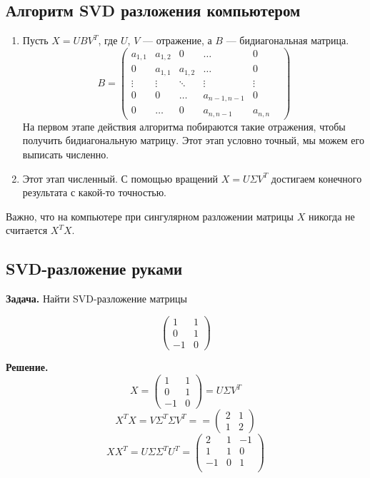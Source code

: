 \documentclass[12pt]{article} %
\theoremstyle{definition} %
\begin{document}
\subsection{Алгоритм SVD разложения компьютером}

\begin{enumerate}
\item Пусть $X=UBV^T$, где $U$, $V$ — отражение, а $B$ — бидиагональная матрица.
\[
B = \begin{pmatrix}
a_{1,1} & a_{1,2} & 0 & \hdots & 0 \\
0 & a_{1,1} & a_{1,2} & \hdots & 0 \\
\vdots & \vdots & \ddots & \vdots & \vdots \\
0 & 0 & \hdots & a_{n-1,n-1} & 0 \\
0 & \hdots & 0 & a_{n,n-1} & a_{n,n} &
\end{pmatrix}
\]
На первом этапе действия алгоритма побираются такие отражения, чтобы получить бидиагональную матрицу. Этот этап условно точный, мы можем его выписать численно.
\item Этот этап численный. С помощью вращений  $X = U \Sigma V^T$ достигаем конечного результата с какой-то точностью.
\end{enumerate}

Важно, что на компьютере при сингулярном разложении матрицы $X$ никогда не считается $X^TX$.
\subsection{SVD-разложение руками}
\textbf{Задача.} Найти SVD-разложение матрицы

\[
\begin{pmatrix}
1 & 1  \\
0 & 1 \\
-1 & 0
\end{pmatrix}
\]

\textbf{Решение.}
\[
X = \begin{pmatrix}
1 & 1  \\
0 & 1 \\
-1 & 0
\end{pmatrix} = U \Sigma V^T
\]
\[X^TX = V \Sigma^T \Sigma V^T= = \begin{pmatrix}
2 & 1 \\
1 & 2
\end{pmatrix}\]
\[XX^T= U \Sigma \Sigma^T U^T= \begin{pmatrix}
2 & 1 & -1 \\
1& 1 & 0 \\
-1 & 0 & 1 \\
\end{pmatrix}\]
\end{document}

